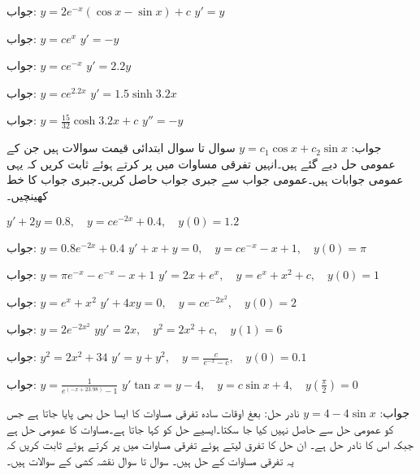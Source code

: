 جواب:\quad
 $y=2e^{-x}(\cos x-\sin x)+c$
\quad
$y'=y$

جواب:\quad
$y=ce^{x}$
\quad
$y'=-y$

جواب:\quad
$y=ce^{-x}$
\quad
$y'=2.2y$

جواب:\quad
$y=ce^{2.2x}$
\quad
$y'=1.5\sinh 3.2x$

جواب:\quad
$y=\tfrac{15}{32}\cosh 3.2x+c$
\quad
$y''=-y$

جواب:\quad
$y=c_1\cos x+c_2\sin x$
سوال  تا سوال  ابتدائی قیمت سوالات ہیں جن کے عمومی حل دیے گئے ہیں۔انہیں تفرقی مساوات میں پر کرتے ہوئے ثابت کریں کہ یہی عمومی جوابات ہیں۔عمومی جواب سے جبری جواب حاصل کریں۔جبری جواب کا خط کھینچیں۔

\quad
$y'+2y=0.8,\quad y=ce^{-2x}+0.4,\quad y(0)=1.2$

جواب:\quad
$y=0.8e^{-2x}+0.4$
\quad
$y'+x+y=0,\quad y=ce^{-x}-x+1,\quad y(0)=\pi$

جواب:\quad
$y=\pi e^{-x}-e^{-x}-x+1$
\quad
$y'=2x+e^{x},\quad y=e^{x}+x^2+c,\quad y(0)=1$

جواب:\quad
$y=e^{x}+x^2$
\quad
$y'+4xy=0,\quad y=ce^{-2x^2},\quad y(0)=2$

جواب:\quad
$y=2e^{-2x^2}$
\quad
$yy'=2x,\quad y^2=2x^2+c,\quad y(1)=6$

جواب:\quad
$y^2=2x^2+34$
\quad
$y'=y+y^2,\quad y=\tfrac{c}{e^{-x}-c},\quad y(0)=0.1$

جواب:\quad
$y=\tfrac{1}{e^{(-x+23.98)}-1}$
\quad
$y'\tan x=y-4,\quad y=c\sin x+4,\quad y(\tfrac{\pi}{2})=0$

جواب:\quad
$y=4-4\sin x$
نادر حل: بعغ اوقات سادہ تفرقی مساوات کا ایسا حل بھی پایا جاتا ہے جس کو عمومی حل سے حاصل نہیں کیا جا سکتا۔ایسیے حل کو  کہا جاتا ہے۔مساوات  کا عمومی حل  ہے جبکہ اس کا  نادر حل  ہے۔ ان حل کا تفرق لیتے ہوئے تفرقی مساوات میں پر کرتے ہوئے ثابت کریں کہ یہ تفرقی مساوات کے حل ہیں۔
سوال  تا سوال  نقشہ کشی کے سوالات ہیں۔

